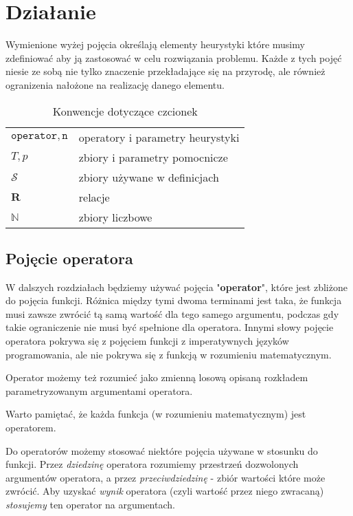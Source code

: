 \documentclass[twoside]{iisthesis}
\newcommand{\numberSet}{\mathbb}
\newcommand{\important}{\mathcal}
\newcommand{\R}{\mathbf{R}}
\newcommand{\param}{\mathtt}
\begin{document}
\section{Działanie}

Wymienione wyżej pojęcia określają elementy heurystyki które musimy zdefiniować aby ją zastosować w celu rozwiązania problemu. Każde z tych pojęć niesie ze sobą nie tylko znaczenie przekładające się na przyrodę, ale również ogranizenia nałożone na realizację danego elementu.

%

\begin{table}
	\caption{Konwencje dotyczące czcionek \label{table_conventions}}
	\begin{tabularx}{\linewidth}{lX}
		$\param{operator}, \param{n}$ & operatory i parametry heurystyki \\
		$T, p$ & zbiory i parametry pomocnicze \\
		$\important{S}$ & zbiory używane w definicjach \\
		$\R$ & relacje \\
		$\numberSet{N}$ & zbiory liczbowe
	\end{tabularx}
\end{table}

\subsection{Pojęcie operatora} \label{subsection_operator}

W dalszych rozdziałach będziemy używać pojęcia "\textbf{operator}", które jest zbliżone do pojęcia funkcji. Różnica między tymi dwoma terminami jest taka, że funkcja musi zawsze zwrócić tą samą wartość dla tego samego argumentu, podczas gdy takie ograniczenie nie musi być spełnione dla operatora. Innymi słowy pojęcie operatora pokrywa się z pojęciem funkcji z imperatywnych języków programowania, ale nie pokrywa się z funkcją w rozumieniu matematycznym.

Operator możemy też rozumieć jako zmienną losową opisaną rozkładem parametryzowanym argumentami operatora.

Warto pamiętać, że każda funkcja (w rozumieniu matematycznym) jest operatorem.

Do operatorów możemy stosować niektóre pojęcia używane w stosunku do funkcji. Przez \emph{dziedzinę} operatora rozumiemy przestrzeń dozwolonych argumentów operatora, a przez \emph{przeciwdziedzinę} - zbiór wartości które może zwrócić. Aby uzyskać \emph{wynik} operatora (czyli wartość przez niego zwracaną) \emph{stosujemy} ten operator na argumentach.
\end{document}
